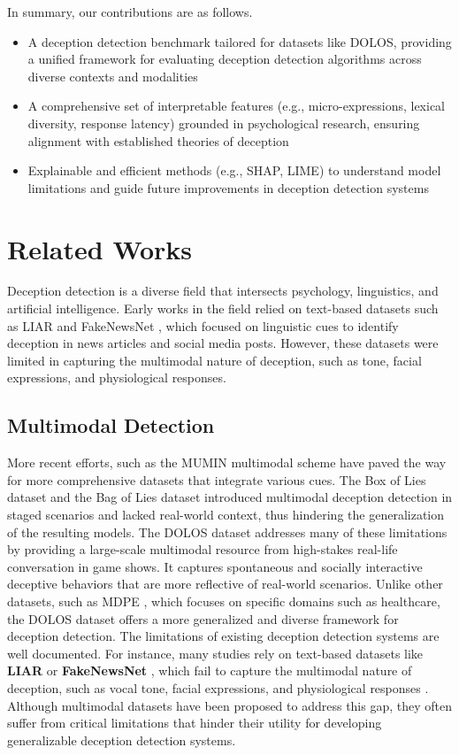 \documentclass{article} %
\begin{document}
In summary, our contributions are as follows.
\begin{itemize}
  \item A deception detection benchmark tailored for datasets like DOLOS, providing a unified framework for evaluating deception detection algorithms across diverse contexts and modalities
  \item A comprehensive set of interpretable features (e.g., micro-expressions, lexical diversity, response latency) grounded in psychological research, ensuring alignment with established theories of deception
  \item Explainable and efficient methods (e.g., SHAP, LIME) to understand model limitations and guide future improvements in deception detection systems
\end{itemize}

\section{Related Works}
\label{gen_inst}
Deception detection is a diverse field that intersects psychology, linguistics, and artificial intelligence. Early works in the field relied on text-based datasets such as LIAR \citep{wang2017liarliarpantsfire} and FakeNewsNet \citep{shu2019fakenewsnet}, which focused on linguistic cues to identify deception in news articles and social media posts. However, these datasets were limited in capturing the multimodal nature of deception, such as tone, facial expressions, and physiological responses. 

\subsection{Multimodal Detection}
More recent efforts, such as the MUMIN multimodal scheme \citep{article} have paved the way for more comprehensive datasets that integrate various cues. The Box of Lies dataset \citep{soldner2019box} and the Bag of Lies dataset \citep{9025340} introduced multimodal deception detection in staged scenarios and lacked real-world context, thus hindering the generalization of the resulting models. The DOLOS dataset \citep{guo2023audiovisualdeceptiondetectiondolos} addresses many of these limitations by providing a large-scale multimodal resource from high-stakes real-life conversation in game shows. It captures spontaneous and socially interactive deceptive behaviors that are more reflective of real-world scenarios. Unlike other datasets, such as MDPE \citep{cai2024mdpemultimodaldeceptiondataset}, which focuses on specific domains such as healthcare, the DOLOS dataset offers a more generalized and diverse framework for deception detection. The limitations of existing deception detection systems are well documented. For instance, many studies rely on text-based datasets like \textbf{LIAR} \citep{wang2017liarliarpantsfire} or \textbf{FakeNewsNet} \citep{shu2019fakenewsnet}, which fail to capture the multimodal nature of deception, such as vocal tone, facial expressions, and physiological responses \citep{10.1177/0261927X02021004001}. Although multimodal datasets have been proposed to address this gap, they often suffer from critical limitations that hinder their utility for developing generalizable deception detection systems.
\end{document}
